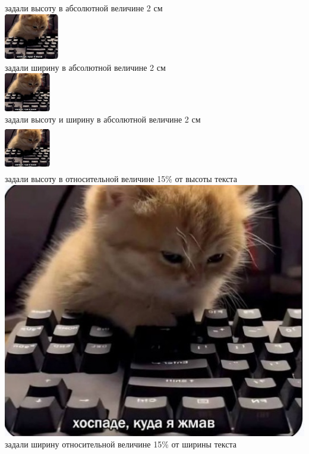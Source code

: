 \documentclass{article}
\begin{document}
задали высоту в абсолютной величине 2 см \\
\includegraphics[height=2cm]{mem} 
\\
задали ширину в абсолютной величине 2 см \\
\includegraphics[width=2cm]{mem} %
\\
задали высоту и ширину в абсолютной величине 2 см \\
\includegraphics[height=2cm, width=2cm]{mem} 
\\
задали высоту в относительной величине 15\% от высоты текста \\
\includegraphics[height=0.15\textheight]{mem} 
\\
задали ширину относительной величине 15\% от ширины текста \\
\end{document}
